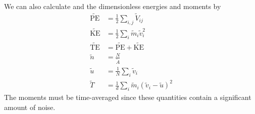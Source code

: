 \documentclass[11pt]{article}
\begin{document}
We can also calculate and the dimensionless energies and moments by
\begin{align*}
\tilde{\text{PE}} 	&= \frac{1}{2}\sum_{i,j}\tilde{V}_{ij} \\
\tilde{\text{KE}} 	&= \frac{1}{2}\sum_{i}\tilde{m}_i\tilde{v}_i^2 \\
\tilde{\text{TE}} 	&= \tilde{\text{PE}} + \tilde{\text{KE}} \\
\tilde{n}			&= \frac{N}{\tilde{A}} \\
\tilde{u}			&= \frac{1}{N}\sum_{i}\tilde{v}_i \\
\tilde{T}			&= \frac{1}{d}\sum_{i}\tilde{m}_i\left(\tilde{v}_i-\tilde{u}\right)^2
\end{align*}
The moments must be time-averaged since these quantities contain a significant amount of noise.
\end{document}
